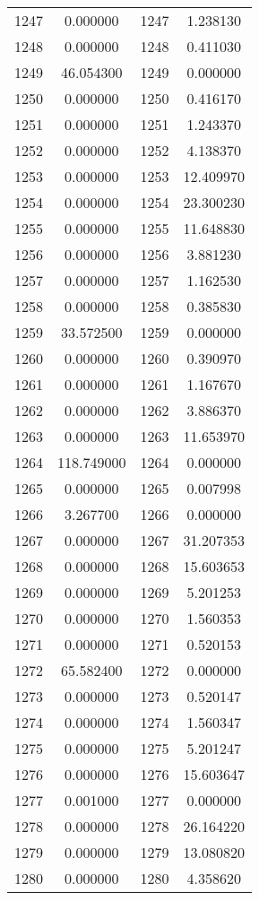 \documentclass[12pt]{article}
\begin{document}
\begin{longtable}{@{}cccc@{}}
1247 & 0.000000 & 1247 & 1.238130 \\
1248 & 0.000000 & 1248 & 0.411030 \\
1249 & 46.054300 & 1249 & 0.000000 \\
1250 & 0.000000 & 1250 & 0.416170 \\
1251 & 0.000000 & 1251 & 1.243370 \\
1252 & 0.000000 & 1252 & 4.138370 \\
1253 & 0.000000 & 1253 & 12.409970 \\
1254 & 0.000000 & 1254 & 23.300230 \\
1255 & 0.000000 & 1255 & 11.648830 \\
1256 & 0.000000 & 1256 & 3.881230 \\
1257 & 0.000000 & 1257 & 1.162530 \\
1258 & 0.000000 & 1258 & 0.385830 \\
1259 & 33.572500 & 1259 & 0.000000 \\
1260 & 0.000000 & 1260 & 0.390970 \\
1261 & 0.000000 & 1261 & 1.167670 \\
1262 & 0.000000 & 1262 & 3.886370 \\
1263 & 0.000000 & 1263 & 11.653970 \\
1264 & 118.749000 & 1264 & 0.000000 \\
1265 & 0.000000 & 1265 & 0.007998 \\
1266 & 3.267700 & 1266 & 0.000000 \\
1267 & 0.000000 & 1267 & 31.207353 \\
1268 & 0.000000 & 1268 & 15.603653 \\
1269 & 0.000000 & 1269 & 5.201253 \\
1270 & 0.000000 & 1270 & 1.560353 \\
1271 & 0.000000 & 1271 & 0.520153 \\
1272 & 65.582400 & 1272 & 0.000000 \\
1273 & 0.000000 & 1273 & 0.520147 \\
1274 & 0.000000 & 1274 & 1.560347 \\
1275 & 0.000000 & 1275 & 5.201247 \\
1276 & 0.000000 & 1276 & 15.603647 \\
1277 & 0.001000 & 1277 & 0.000000 \\
1278 & 0.000000 & 1278 & 26.164220 \\
1279 & 0.000000 & 1279 & 13.080820 \\
1280 & 0.000000 & 1280 & 4.358620 \\

\end{longtable}
\end{document}
